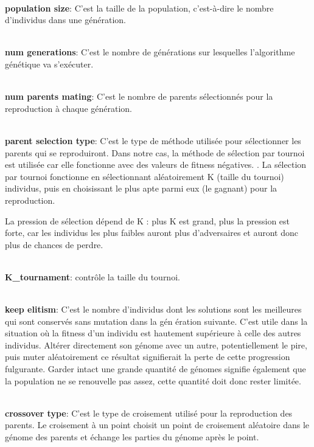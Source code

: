\documentclass[journal, a4paper]{IEEEtran}
\begin{document}
    \\ \textbf{population size}: C'est la taille de la population,
	c'est-à-dire le nombre d'individus dans une génération.

    \\ \textbf{num generations}: C'est le nombre de générations sur
	lesquelles l'algorithme génétique va s'exécuter.

    \\ \textbf{num parents mating}: C'est le nombre de parents
	sélectionnés pour la reproduction à chaque génération.

    \\ \textbf{parent selection type}: C'est le type de méthode
	utilisée pour sélectionner les parents qui se reproduiront.
	Dans notre cas, la méthode de sélection par tournoi est utilisée
	car elle fonctionne avec des valeurs de fitness négatives.
	. La sélection par tournoi fonctionne en sélectionnant
	aléatoirement K (taille du tournoi) individus, puis en choisissant
	le plus apte parmi eux (le gagnant) pour la reproduction.

	La pression de sélection dépend de K : plus K est grand,
	plus la pression est forte, car les individus les plus faibles
	auront plus d'adversaires et auront donc plus de chances de perdre.

	\\ \textbf{K\_tournament}: contrôle la taille du tournoi.

    \\ \textbf{keep elitism}: C'est le nombre d'individus dont les
	solutions sont les meilleures
	qui sont conservés sans mutation dans la gén
	ération suivante. C'est utile dans la situation où la fitness d'un
	individu est hautement supérieure à celle des autres individus.
	Altérer directement son génome avec un autre, potentiellement le
	pire, puis
	muter aléatoirement ce résultat signifierait la perte de cette
	progression fulgurante. Garder intact une grande quantité de
	génomes
	signifie également que la population ne se renouvelle pas assez,
	cette quantité doit donc rester limitée.

    \\ \textbf{crossover type}: C'est le type de croisement utilisé
	pour la reproduction des parents. Le croisement à un point
	choisit un point de croisement aléatoire dans le génome des
	parents et échange les parties du génome
	après le point.
\end{document}
